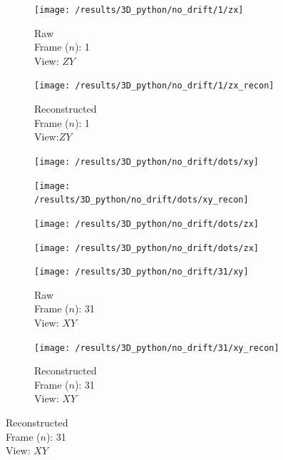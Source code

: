 \begin{figure}
    \begin{subfigure}[t]{0.2\linewidth}
        \centering
        \texttt{[image: /results/3D\_python/no\_drift/1/zx]}\caption{Raw\\Frame (\(n\)): 1\\View: \(ZY\)}
    \end{subfigure}\hfill
    \begin{subfigure}[t]{0.2\linewidth}
        \centering
        \texttt{[image: /results/3D\_python/no\_drift/1/zx\_recon]}\caption{Reconstructed\\Frame (\(n\)): 1\\View:\(ZY\)}
    \end{subfigure}
    \begin{subfigure}[t]{0.2\linewidth}
        \centering
        \texttt{[image: /results/3D\_python/no\_drift/dots/xy]}%
    \end{subfigure}\hfill
    \begin{subfigure}[t]{0.2\linewidth}
        \centering
        \texttt{[image: /results/3D\_python/no\_drift/dots/xy\_recon]}%
    \end{subfigure}\hfill
    \begin{subfigure}[t]{0.2\linewidth}
        \centering
        \texttt{[image: /results/3D\_python/no\_drift/dots/zx]}%
    \end{subfigure}\hfill
    \begin{subfigure}[t]{0.2\linewidth}
        \centering
        \texttt{[image: /results/3D\_python/no\_drift/dots/zx]}%
    \end{subfigure}
    \begin{subfigure}[t]{0.2\linewidth}
        \centering
        \texttt{[image: /results/3D\_python/no\_drift/31/xy]}\caption{Raw\\Frame (\(n\)): 31\\View: \(XY\)}
    \end{subfigure}\hfill
    \begin{subfigure}[t]{0.2\linewidth}
        \centering
        \texttt{[image: /results/3D\_python/no\_drift/31/xy\_recon]}\caption{Reconstructed\\Frame (\(n\)): 31\\View: \(XY\)}
    \end{subfigure}\hfill

\end{figure}
